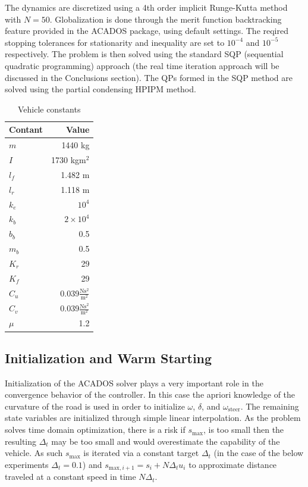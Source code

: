 \documentclass[conference,11pt]{IEEEtran}
\begin{document}
The dynamics are discretized using a 4th order implicit Runge-Kutta method with $N = 50$. Globalization is done through the merit function backtracking feature provided in the ACADOS package, using
default settings. The reqired stopping tolerances for stationarity and inequality are set to $10^{-4}$ and $10^{-5}$ respectively. The problem is then solved using the standard SQP (sequential
quadratic programming) approach (the real time iteration approach will be discussed in the Conclusions section). The QPs formed in the SQP method are solved using the partial condensing HPIPM
\cite{FRISON2003} method.
\begin{table}[t]
  \centering
  \begin{tabular}{l|r}
    Contant & Value \\\hline
    $m$& 1440 kg\\
    $I$&1730 kgm$^2$\\
    $l_f$&1.482 m\\
    $l_r$&1.118 m\\
    $k_e$&$10^4$\\
    $k_b$&$2\times 10^4$\\
    $b_b$&0.5\\
    $m_b$&0.5\\
    $K_r$&29\\
    $K_f$&29\\
    $C_u$&0.039$\frac{\mathrm{N}\mathrm{s}^2}{\mathrm{m}^2}$\\
    $C_v$&0.039$\frac{\mathrm{N}\mathrm{s}^2}{\mathrm{m}^2}$\\
    $\mu$&1.2\\
  \end{tabular}
  \caption{Vehicle constants}
  \label{tab:vef}
\end{table}
\subsection{Initialization and Warm Starting}
Initialization of the ACADOS solver plays a very important role in the convergence behavior of the controller. In this case the apriori knowledge of the curvature of the road is used in order to
initialize $\omega$, $\delta$, and $\omega_{\mathrm{steer}}$. The remaining state variables are initialized through simple linear interpolation. As the problem solves time domain optimization, there
is a risk if $s_{\mathrm{max}}$, is too small then the resulting $\Delta_t$ may be too small and would overestimate the capability of the vehicle. As such $s_{\mathrm{max}}$ is iterated via a
constant target $\Delta_t$ (in the case of the below experiments $\Delta_t = 0.1$) and $s_{\mathrm{max},i+1}= s_i + N\Delta_tu_i$ to approximate distance traveled at a constant speed in time
$N\Delta_t$. 
\end{document}
